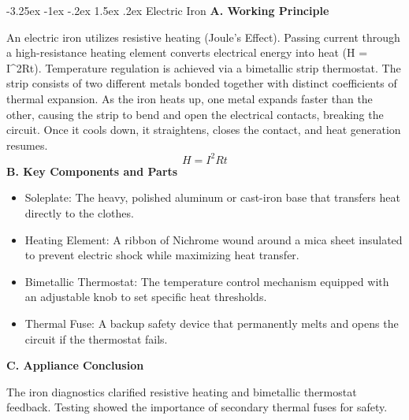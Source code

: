 \documentclass[11pt,a4paper]{report}
\makeatletter
\renewcommand{\section}{\@startsection{section}{1}{\z@}%
  {-3.25ex \@plus -1ex \@minus -.2ex}%
  {1.5ex \@plus.2ex}%
  {\normalfont\Large\bfseries\color{primaryColor}}}
\makeatother
\begin{document}
\section{Electric Iron}
\noindent\textbf{A. Working Principle}\par\medskip
An electric iron utilizes resistive heating (Joule's Effect). Passing current through a high-resistance heating element converts electrical energy into heat (H = I\textasciicircum{}2Rt). Temperature regulation is achieved via a bimetallic strip thermostat. The strip consists of two different metals bonded together with distinct coefficients of thermal expansion. As the iron heats up, one metal expands faster than the other, causing the strip to bend and open the electrical contacts, breaking the circuit. Once it cools down, it straightens, closes the contact, and heat generation resumes.
\begin{equation}H = I^2 R t\end{equation}
\noindent\textbf{B. Key Components and Parts}\par\medskip
\begin{itemize}
  \item Soleplate: The heavy, polished aluminum or cast-iron base that transfers heat directly to the clothes.
  \item Heating Element: A ribbon of Nichrome wound around a mica sheet insulated to prevent electric shock while maximizing heat transfer.
  \item Bimetallic Thermostat: The temperature control mechanism equipped with an adjustable knob to set specific heat thresholds.
  \item Thermal Fuse: A backup safety device that permanently melts and opens the circuit if the thermostat fails.
\end{itemize}
\noindent\textbf{C. Appliance Conclusion}\par\medskip
The iron diagnostics clarified resistive heating and bimetallic thermostat feedback. Testing showed the importance of secondary thermal fuses for safety.
\end{document}
